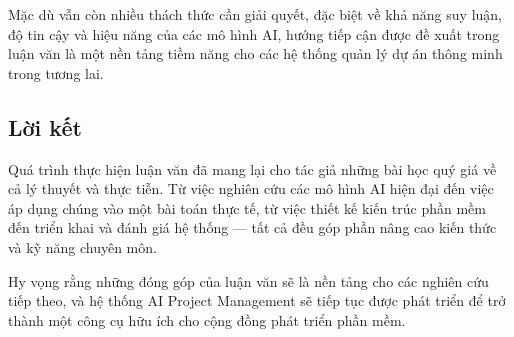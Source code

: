 \documentclass[12pt,a4paper]{report}
\begin{document}
Mặc dù vẫn còn nhiều thách thức cần giải quyết, đặc biệt về khả năng suy luận, độ tin cậy và hiệu năng của các mô hình AI, hướng tiếp cận được đề xuất trong luận văn là một nền tảng tiềm năng cho các hệ thống quản lý dự án thông minh trong tương lai.

\subsection{Lời kết}

Quá trình thực hiện luận văn đã mang lại cho tác giả những bài học quý giá về cả lý thuyết và thực tiễn. Từ việc nghiên cứu các mô hình AI hiện đại đến việc áp dụng chúng vào một bài toán thực tế, từ việc thiết kế kiến trúc phần mềm đến triển khai và đánh giá hệ thống — tất cả đều góp phần nâng cao kiến thức và kỹ năng chuyên môn.

Hy vọng rằng những đóng góp của luận văn sẽ là nền tảng cho các nghiên cứu tiếp theo, và hệ thống AI Project Management sẽ tiếp tục được phát triển để trở thành một công cụ hữu ích cho cộng đồng phát triển phần mềm.
\end{document}
